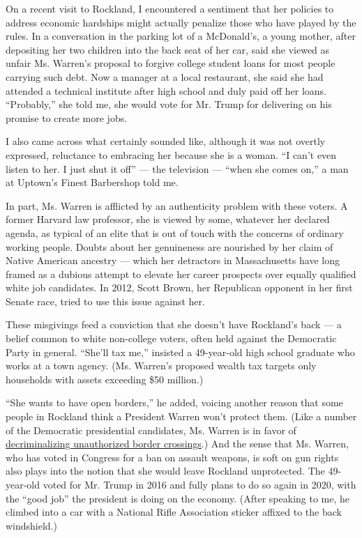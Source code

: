 On a recent visit to Rockland, I encountered a sentiment that her
policies to address economic hardships might actually penalize those who
have played by the rules. In a conversation in the parking lot of a
McDonald's, a young mother, after depositing her two children into the
back seat of her car, said she viewed as unfair Ms. Warren's proposal to
forgive college student loans for most people carrying such debt. Now a
manager at a local restaurant, she said she had attended a technical
institute after high school and duly paid off her loans. ``Probably,''
she told me, she would vote for Mr. Trump for delivering on his promise
to create more jobs.

I also came across what certainly sounded like, although it was not
overtly expressed, reluctance to embracing her because she is a woman.
``I can't even listen to her. I just shut it off'' --- the television
--- ``when she comes on,'' a man at Uptown's Finest Barbershop told me.

In part, Ms. Warren is afflicted by an authenticity problem with these
voters. A former Harvard law professor, she is viewed by some, whatever
her declared agenda, as typical of an elite that is out of touch with
the concerns of ordinary working people. Doubts about her genuineness
are nourished by her claim of Native American ancestry --- which her
detractors in Massachusetts have long framed as a dubious attempt to
elevate her career prospects over equally qualified white job
candidates. In 2012, Scott Brown, her Republican opponent in her first
Senate race, tried to use this issue against her.

These misgivings feed a conviction that she doesn't have Rockland's back
--- a belief common to white non-college voters, often held against the
Democratic Party in general. ``She'll tax me,'' insisted a 49-year-old
high school graduate who works at a town agency. (Ms. Warren's proposed
wealth tax targets only households with assets exceeding \$50 million.)

``She wants to have open borders,'' he added, voicing another reason
that some people in Rockland think a President Warren won't protect
them. (Like a number of the Democratic presidential candidates, Ms.
Warren is in favor of
\href{https://www.nytimes.com/2019/07/31/us/border-crossing-decriminalization.html}{decriminalizing
unauthorized border crossings}.) And the sense that Ms. Warren, who has
voted in Congress for a ban on assault weapons, is soft on gun rights
also plays into the notion that she would leave Rockland unprotected.
The 49-year-old voted for Mr. Trump in 2016 and fully plans to do so
again in 2020, with the ``good job'' the president is doing on the
economy. (After speaking to me, he climbed into a car with a National
Rifle Association sticker affixed to the back windshield.)

